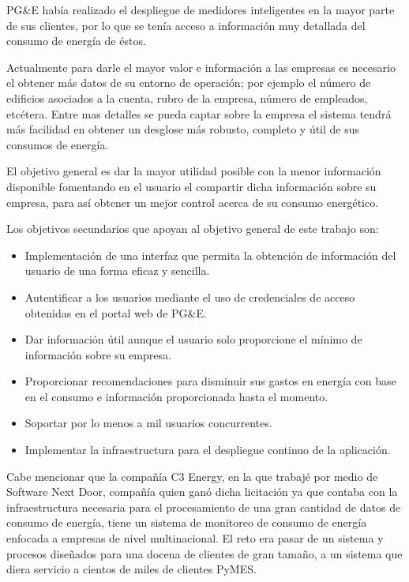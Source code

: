 \documentclass{article}
\begin{document}
PG\&E había realizado el despliegue de medidores inteligentes en la
mayor parte de sus clientes, por lo que se tenía acceso a información
muy detallada del consumo de energía de éstos.

Actualmente para darle el mayor valor e información a las empresas es necesario
el obtener más datos de su entorno de operación; por ejemplo el número
de edificios asociados a la cuenta, rubro de la empresa, número
de empleados, etcétera. Entre mas detalles se pueda captar sobre
la empresa el sistema tendrá más facilidad en obtener un desglose más robusto,
completo y útil de sus consumos de energía.

El objetivo general es dar la mayor utilidad posible con la menor
información disponible fomentando en el usuario el compartir dicha
información sobre su empresa, para así obtener un mejor control
acerca de su consumo energético.

\vspace{2.5mm}

Los objetivos secundarios que apoyan al objetivo general de este trabajo son:
\begin{itemize}
\item Implementación de una interfaz que permita la obtención
  de información del usuario de una forma eficaz y sencilla.
\item Autentificar a los usuarios mediante el uso de credenciales de acceso
  obtenidas en el portal web de PG\&E.
\item Dar información útil aunque el usuario solo proporcione el
  mínimo de información sobre su empresa.
\item Proporcionar recomendaciones para disminuir sus
  gastos en energía con base en el consumo e información proporcionada
  hasta el momento.
\item Soportar por lo menos a mil usuarios concurrentes.
\item Implementar la infraestructura para el despliegue continuo de la
  aplicación. 
\end{itemize}

Cabe mencionar que la compañía C3 Energy, en la que trabajé
por medio de Software Next Door, compañía quien ganó dicha licitación ya
que contaba con la infraestructura necesaria para el procesamiento
de una gran cantidad de datos de consumo de energía, tiene un sistema
de monitoreo de consumo de energía enfocada a empresas de nivel
multinacional. El reto era pasar de un sistema y procesos diseñados
para una docena de clientes de gran tamaño, a un sistema que diera
servicio a cientos de miles de clientes PyMES.
\end{document}
